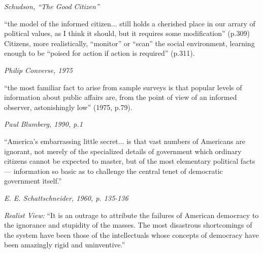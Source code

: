 \documentclass[12pt]{article}
\begin{document}
\hfill 

\textit{Schudson, ``The Good Citizen''}

``the model of the informed citizen... still holds a cherished place in our arrary of political values, as I think it should, but it requires some modification'' (p.309) Citizens, more realistically, ``monitor'' or ``scan'' the social environment, learning enough to be ``poised for action if action is required'' (p.311).  

\hfill 

\textit{Philip Converse, 1975}

``the most familiar fact to arise from sample surveys is that popular levels of information about public affairs are, from the point of view of an informed observer, astonishingly low'' (1975, p.79).  

\hfill 

\textit{Paul Blumberg, 1990, p.1}

``America's embarrassing little secret... is that vast numbers of Americans are ignorant, not merely of the specialized details of government which ordinary citizens cannot be expected to master, but of the most elementary political facts --- information so basic as to challenge the central tenet of democratic government itself.''  

\hfill 

\textit{E. E. Schattschneider, 1960, p. 135-136}

\textit{Realist View:} ``It is an outrage to attribute the failures of American democracy to the ignorance and stupidity of the masses. The most disastrous shortcomings of the system have been those of the intellectuals whose concepts of democracy have been amazingly rigid and uninventive.'' 








\clearpage  %
\printindex %
\end{document}
